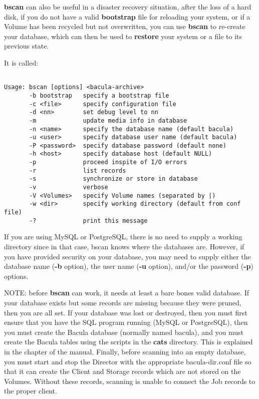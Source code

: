 {\bf bscan} can also be useful in a disaster recovery situation, after the
loss of a hard disk, if you do not have a valid {\bf bootstrap} file for
reloading your system, or if a Volume has been recycled but not overwritten,
you can use {\bf bscan} to re-create your database, which can then be used to
{\bf restore} your system or a file to its previous state. 

It is called: 

\footnotesize
\begin{verbatim}
 
Usage: bscan [options] <bacula-archive>
       -b bootstrap   specify a bootstrap file
       -c <file>      specify configuration file
       -d <nn>        set debug level to nn
       -m             update media info in database
       -n <name>      specify the database name (default bacula)
       -u <user>      specify database user name (default bacula)
       -P <password>  specify database password (default none)
       -h <host>      specify database host (default NULL)
       -p             proceed inspite of I/O errors
       -r             list records
       -s             synchronize or store in database
       -v             verbose
       -V <Volumes>   specify Volume names (separated by |)
       -w <dir>       specify working directory (default from conf file)
       -?             print this message
\end{verbatim}
\normalsize

If you are using MySQL or PostgreSQL, there is no need to supply a working
directory since in that case, bscan knows where the databases are. However, if
you have provided security on your database, you may need to supply either the
database name ({\bf -b} option), the user name ({\bf -u} option), and/or the
password ({\bf -p}) options. 

NOTE: before {\bf bscan} can work, it needs at least a bare bones valid
database.  If your database exists but some records are missing because
they were pruned, then you are all set. If your database was lost or 
destroyed, then you must first ensure that you have the SQL program running
(MySQL or PostgreSQL), then you must create the Bacula database (normally
named bacula), and you must create the Bacula tables using the scripts in
the {\bf cats} directory.  This is explained in the
 chapter of the manual. Finally, before
scanning into an empty database, you must start and stop the Director with
the appropriate bacula-dir.conf file so that it can create the Client and
Storage records which are not stored on the Volumes.  Without these
records, scanning is unable to connect the Job records to the proper
client.

